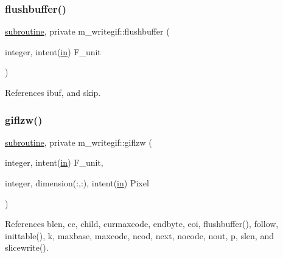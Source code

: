 \mbox{\label{namespacem__writegif_a48c5ca5487be9dbe565c0d4f8aa02d0d}} 
\subsubsection{\texorpdfstring{flushbuffer()}{flushbuffer()}}
{\footnotesize\ttfamily \hyperlink{M__stopwatch_83_8txt_acfbcff50169d691ff02d4a123ed70482}{subroutine}, private m\+\_\+writegif\+::flushbuffer (\begin{DoxyParamCaption}\item[{integer, intent(\hyperlink{M__journal_83_8txt_afce72651d1eed785a2132bee863b2f38}{in})}]{F\+\_\+unit }\end{DoxyParamCaption})\hspace{0.3cm}{\ttfamily [private]}}



References ibuf, and skip.

\mbox{\label{namespacem__writegif_a13c09be69495f4ba21ecb7c134216a17}} 
\subsubsection{\texorpdfstring{giflzw()}{giflzw()}}
{\footnotesize\ttfamily \hyperlink{M__stopwatch_83_8txt_acfbcff50169d691ff02d4a123ed70482}{subroutine}, private m\+\_\+writegif\+::giflzw (\begin{DoxyParamCaption}\item[{integer, intent(\hyperlink{M__journal_83_8txt_afce72651d1eed785a2132bee863b2f38}{in})}]{F\+\_\+unit,  }\item[{integer, dimension(\+:,\+:), intent(\hyperlink{M__journal_83_8txt_afce72651d1eed785a2132bee863b2f38}{in})}]{Pixel }\end{DoxyParamCaption})\hspace{0.3cm}{\ttfamily [private]}}



References blen, cc, child, curmaxcode, endbyte, eoi, flushbuffer(), follow, inittable(), k, maxbase, maxcode, ncod, next, nocode, nout, p, slen, and slicewrite().

\mbox{\label{namespacem__writegif_aed61b15f90188ddf39b71aa0c73a82a8}} 
